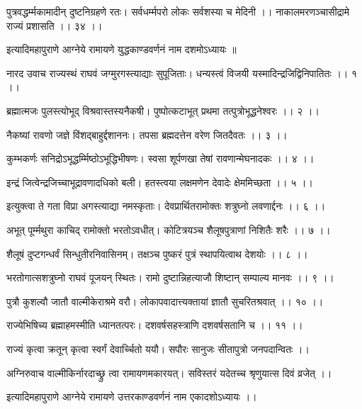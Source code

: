 पुत्रवद्धर्म्मकामादीन् दुष्टनिग्रहणे रतः।
सर्वधर्म्मपरो लोकः सर्वशस्या च मेदिनी ।।
नाकालमरणञ्चासीद्रामे राज्यं प्रशासति ।। ३४ ।।

इत्यादिमहापुराणे आग्नेये रामायणे युद्धकाण्डवर्णनं नाम दशमोऽध्यायः ॥

नारद उवाच
राज्यस्थं राघवं जग्मुरगस्त्याद्याः सुपूजिताः।
धन्यस्त्वं विजयी यस्मादिन्द्रजिद्विनिपातितः ।। १ ।।

ब्रह्मात्मजः पुलस्त्योभूद् विश्रवास्तस्यनैकषी।
पुष्पोत्कटाभूत् प्रथमा तत्पुत्रोभूद्धनेश्वरः ।। २ ।।

नैकष्यां रावणो जज्ञे विंशद्बाहुर्द्दशाननः।
तपसा ब्रह्मदत्तेन वरेण जितदैवतः ।। ३ ।।

कुम्भकर्णः सनिद्रोऽभूद्धर्म्मिष्ठोऽभूद्धिभीषणः।
स्वसा शूर्पणखा तेषां रावणान्मेघनादकः ।। ४ ।।

इन्द्रं जित्वेन्द्रजिच्चाभूद्रावणादधिको बली।
हतस्त्वया लक्षमणेन देवादेः क्षेममिच्छता ।। ५ ।।

इत्युक्त्वा ते गता विप्रा अगस्त्याद्या नमस्कृताः।
देवप्रार्थितरामोक्तः शत्रुघ्नो लवणार्द्दनः ।। ६ ।।

अभूत् पूर्म्मथुरा काचिद् रामोक्तो भरतोऽवधीत्।
कोटित्रयञ्च शैलूषपुत्राणां निशितैः शरैः ।। ७ ।।

शैलूषं दुप्टगन्धर्वं सिन्धुतीरनिवासिनम्।
तक्षञ्च पुष्करं पुत्रं स्थापयित्वाथ देशयोः ।। ८ ।।

भरतोगात्सशत्रुघ्नो राघवं पूजयन् स्थितः।
रामो दुष्टान्निहत्याजौ शिष्टान् सम्पाल्य मानवः ।। ९ ।।

पुत्रौ कुशल्वौ जातौ वाल्मीकेराश्रमे वरौ।
लोकापवादात्त्यक्तायां ज्ञातौ सुचरितश्रवात् ।। १० ।।

राज्येभिषिच्य ब्रह्माहमस्मीति ध्यानतत्परः।
दशवर्षसहस्त्राणि दशवर्षसतानि च ।। ११ ।।

राज्यं कृत्वा क्रतून् कृत्वा स्वर्गं देवार्च्चितो ययौ।
सपौरः सानुजः सीतापुत्रो जनपदान्वितः ।।
                     
अग्निरुवाच
वाल्मीकिर्नारदाच्छ्रु त्वा रामायणमकारयत्।
सविस्तरं यदेतच्च श्रृणुयात्स दिवं व्रजेत् ।।

इत्यादिमहापुराणे आग्नेये रामायणे उत्तरकाण्डवर्णनं नाम एकादशोऽध्यायः ।।